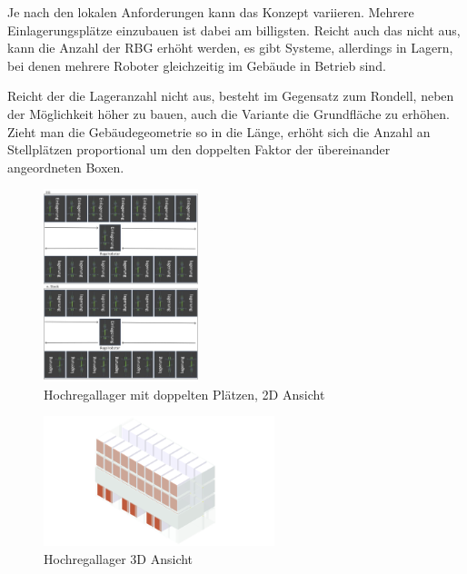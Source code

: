 \clearpage

Je nach den lokalen Anforderungen kann das Konzept variieren. Mehrere Einlagerungsplätze einzubauen ist dabei am billigsten. Reicht auch das nicht aus, kann die Anzahl der \ac{RBG} erhöht werden, es gibt Systeme, allerdings in Lagern, bei denen mehrere Roboter gleichzeitig im Gebäude in Betrieb sind.

\indent Reicht der die Lageranzahl nicht aus, besteht im Gegensatz zum Rondell, neben der Möglichkeit höher zu bauen, auch die Variante die Grundfläche zu erhöhen. Zieht man die Gebäudegeometrie so in die Länge, erhöht sich die Anzahl an Stellplätzen proportional um den doppelten Faktor der übereinander angeordneten Boxen.

\begin{figure}[H]
    \centering
    \includegraphics[width=0.4\textwidth]{images/hochregallager2ddoppelt.jpg}
    \caption{Hochregallager mit doppelten Plätzen, 2D Ansicht}
    \label{fig:hochregallager2ddoppelt}
\end{figure}

\begin{figure}[H]
    \centering
    \includegraphics[width=0.6\textwidth]{images/hochregallager3d.png}
    \caption{Hochregallager 3D Ansicht}
    \label{fig:hochregallager3d}
\end{figure}

